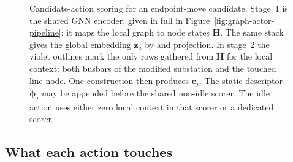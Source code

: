 \begin{figure}[H]
  \centering
  \resizebox{0.99\linewidth}{!}{%
  }
  \caption[Candidate-action scoring pipeline]{Candidate-action scoring for an
  endpoint-move candidate. Stage~1 is the shared GNN encoder, given in full in
  Figure~\ref{fig:graph-actor-pipeline}: it maps the local graph to node states
  $\mathbf H$. The same stack gives the global embedding $\mathbf z_a$ by
   and projection. In stage~2 the violet outlines mark the only
  rows gathered from $\mathbf H$ for the local context: both busbars of the
  modified substation and the touched line node. One 
  construction then produces $\mathbf c_j$. The static descriptor
  $\boldsymbol\phi_j$ may be appended before the shared non-idle scorer. The
  idle action uses either zero local context in that scorer or a dedicated
  scorer.}
  \label{fig:candidate-action-scoring-pipeline}
\end{figure}

\subsection{What each action touches}
\label{subsec:candidate-action-metadata}

\\
\\

\subsection{\texorpdfstring{}{Candidate pooling of the touched nodes}}
\label{subsec:candidate-pooling}

